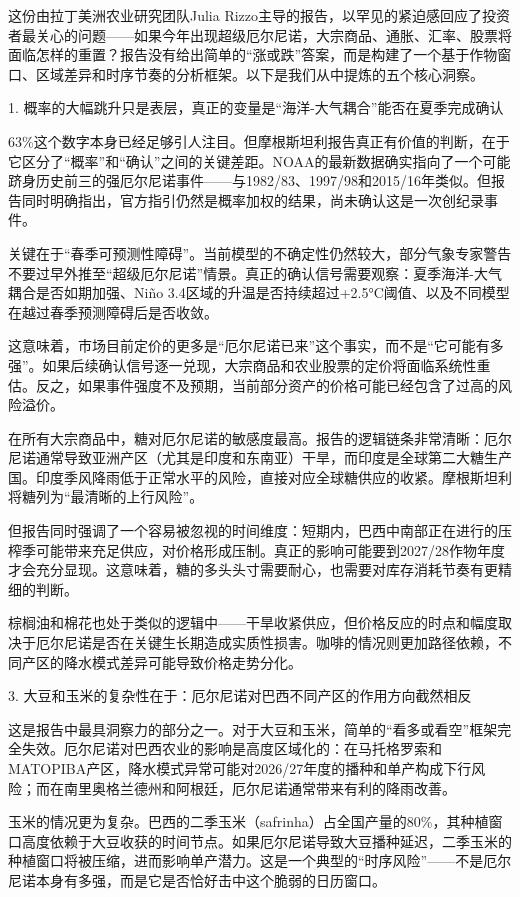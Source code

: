 \documentclass[11pt]{ctexart}
\begin{document}
这份由拉丁美洲农业研究团队Julia Rizzo主导的报告，以罕见的紧迫感回应了投资者最关心的问题——如果今年出现超级厄尔尼诺，大宗商品、通胀、汇率、股票将面临怎样的重置？报告没有给出简单的“涨或跌”答案，而是构建了一个基于作物窗口、区域差异和时序节奏的分析框架。以下是我们从中提炼的五个核心洞察。

1. 概率的大幅跳升只是表层，真正的变量是“海洋-大气耦合”能否在夏季完成确认

63\%这个数字本身已经足够引人注目。但摩根斯坦利报告真正有价值的判断，在于它区分了“概率”和“确认”之间的关键差距。NOAA的最新数据确实指向了一个可能跻身历史前三的强厄尔尼诺事件——与1982/83、1997/98和2015/16年类似。但报告同时明确指出，官方指引仍然是概率加权的结果，尚未确认这是一次创纪录事件。

关键在于“春季可预测性障碍”。当前模型的不确定性仍然较大，部分气象专家警告不要过早外推至“超级厄尔尼诺”情景。真正的确认信号需要观察：夏季海洋-大气耦合是否如期加强、Niño 3.4区域的升温是否持续超过+2.5°C阈值、以及不同模型在越过春季预测障碍后是否收敛。

这意味着，市场目前定价的更多是“厄尔尼诺已来”这个事实，而不是“它可能有多强”。如果后续确认信号逐一兑现，大宗商品和农业股票的定价将面临系统性重估。反之，如果事件强度不及预期，当前部分资产的价格可能已经包含了过高的风险溢价。

在所有大宗商品中，糖对厄尔尼诺的敏感度最高。报告的逻辑链条非常清晰：厄尔尼诺通常导致亚洲产区（尤其是印度和东南亚）干旱，而印度是全球第二大糖生产国。印度季风降雨低于正常水平的风险，直接对应全球糖供应的收紧。摩根斯坦利将糖列为“最清晰的上行风险”。

但报告同时强调了一个容易被忽视的时间维度：短期内，巴西中南部正在进行的压榨季可能带来充足供应，对价格形成压制。真正的影响可能要到2027/28作物年度才会充分显现。这意味着，糖的多头头寸需要耐心，也需要对库存消耗节奏有更精细的判断。

棕榈油和棉花也处于类似的逻辑中——干旱收紧供应，但价格反应的时点和幅度取决于厄尔尼诺是否在关键生长期造成实质性损害。咖啡的情况则更加路径依赖，不同产区的降水模式差异可能导致价格走势分化。

3. 大豆和玉米的复杂性在于：厄尔尼诺对巴西不同产区的作用方向截然相反

这是报告中最具洞察力的部分之一。对于大豆和玉米，简单的“看多或看空”框架完全失效。厄尔尼诺对巴西农业的影响是高度区域化的：在马托格罗索和MATOPIBA产区，降水模式异常可能对2026/27年度的播种和单产构成下行风险；而在南里奥格兰德州和阿根廷，厄尔尼诺通常带来有利的降雨改善。

玉米的情况更为复杂。巴西的二季玉米（safrinha）占全国产量的80\%，其种植窗口高度依赖于大豆收获的时间节点。如果厄尔尼诺导致大豆播种延迟，二季玉米的种植窗口将被压缩，进而影响单产潜力。这是一个典型的“时序风险”——不是厄尔尼诺本身有多强，而是它是否恰好击中这个脆弱的日历窗口。
\end{document}

